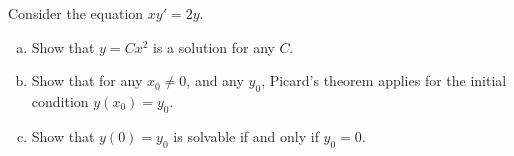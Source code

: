 \begin{exercise}
Consider the equation $x y' = 2y$.
\begin{enumerate}[a)]
\item
Show that $y = Cx^2$ is a solution for any $C$.
\item
Show that for any $x_0 \not= 0$, and any $y_0$, Picard's
theorem applies for the initial condition $y(x_0) = y_0$.
\item
Show that $y(0) = y_0$ is solvable if and only if $y_0 = 0$.
\end{enumerate}
\end{exercise}
